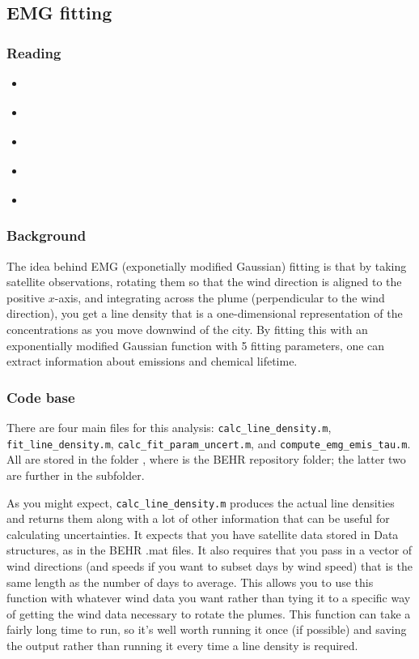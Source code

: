 \documentclass[12pt]{article}
\begin{document}
	
	\subsection{EMG fitting}
		\subsubsection{Reading}
		\begin{itemize}
		\item \citealt{beirle11}
		\item \citealt{valin13}
		\item \citealt{deFoy14}
		\item \citealt{lu15}
		\item \citealt{laughner16}
		\end{itemize}
		
		\subsubsection{Background}
		The idea behind EMG (exponetially modified Gaussian) fitting is that by taking satellite  observations, rotating them so that the wind direction is aligned to the positive $x$-axis, and integrating across the plume (perpendicular to the wind direction), you get a line density that is a one-dimensional representation of the  concentrations as you move downwind of the city. By fitting this with an exponentially modified Gaussian function with 5 fitting parameters, one can extract information about emissions and chemical lifetime.
		
		\subsubsection{Code base}
		There are four main files for this analysis: \lstinline$calc_line_density.m$, \lstinline$fit_line_density.m$, \lstinline$calc_fit_param_uncert.m$, and \lstinline$compute_emg_emis_tau.m$.  All are stored in the folder , where  is the BEHR repository folder; the latter two are further in the  subfolder.
		
		As you might expect, \lstinline$calc_line_density.m$ produces the actual line densities and returns them along with a lot of other information that can be useful for calculating uncertainties. It expects that you have satellite data stored in Data structures, as in the BEHR .mat files. It also requires that you pass in a vector of wind directions (and speeds if you want to subset days by wind speed) that is the same length as the number of days to average. This allows you to use this function with whatever wind data you want rather than tying it to a specific way of getting the wind data necessary to rotate the plumes. This function can take a fairly long time to run, so it's well worth running it once (if possible) and saving the output rather than running it every time a line density is required.
		
\end{document}
